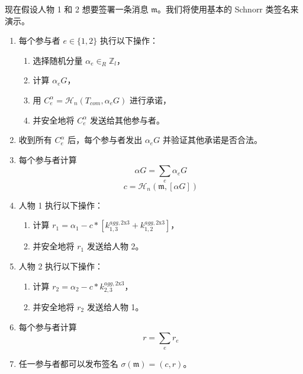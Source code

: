 现在假设人物 1 和 2 想要签署一条消息 $\mathfrak{m}$。我们将使用基本的 Schnorr 类签名来演示。
\begin{enumerate}
    \item 每个参与者 $e \in \{1,2\}$ 执行以下操作：
    \begin{enumerate}
        \item 选择随机分量 $\alpha_e \in_R \mathbb{Z}_l$，
        \item 计算 $\alpha_e G$，
        \item 用 $C^{\alpha}_{e} = \mathcal{H}_n(T_{com},\alpha_e G)$ 进行承诺，
        \item 并安全地将 $C^{\alpha}_{e}$ 发送给其他参与者。
    \end{enumerate}
    \item 收到所有 $C^{\alpha}_{e}$ 后，每个参与者发出 $\alpha_e G$ 并验证其他承诺是否合法。
    \item 每个参与者计算
    \[\alpha G = \sum_e \alpha_e G\]
    \[c = \mathcal{H}_n(\mathfrak{m},[\alpha G])\]
    \item 人物 1 执行以下操作：
    \begin{enumerate}
        \item 计算 $r_1 = \alpha_1 - c*[k^{agg,\textrm{2x3}}_{1,3} + k^{agg,\textrm{2x3}}_{1,2}]$，
        \item 并安全地将 $r_1$ 发送给人物 2。
    \end{enumerate}
    \item 人物 2 执行以下操作：
    \begin{enumerate}
        \item 计算 $r_2 = \alpha_2 - c*k^{agg,\textrm{2x3}}_{2,3}$，
        \item 并安全地将 $r_2$ 发送给人物 1。
    \end{enumerate}
    \item 每个参与者计算
    \[r = \sum_e r_e\]
    \item 任一参与者都可以发布签名 $\sigma(\mathfrak{m}) = (c,r)$。
\end{enumerate}

